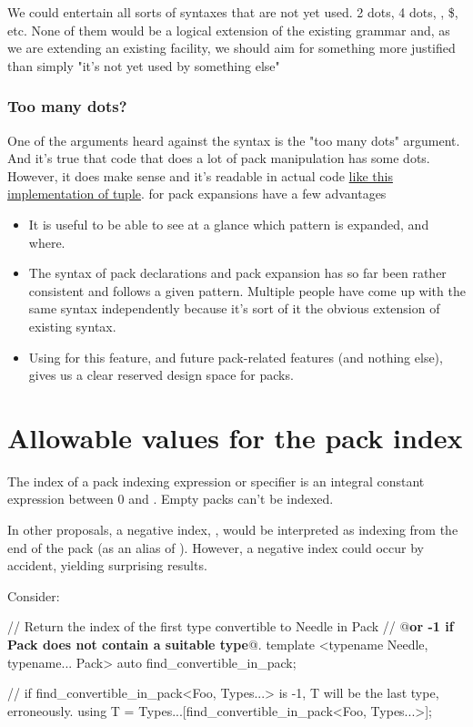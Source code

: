 \documentclass{wg21}
\begin{document}
We could entertain all sorts of syntaxes that are not yet used. 2 dots, 4 dots, \tcode{!},  \$, etc.
None of them would be a logical extension of the existing grammar and, as we are extending an existing facility, we should aim for something more justified than simply "it's not yet used by something else"

\subsubsection{Too many dots?}

One of the arguments heard against the  syntax is the "too many dots" argument.
And it's true that code that does a lot of pack manipulation has some dots.
However, it does make sense and it's readable in actual code \href{https://github.com/seanbaxter/circle/blob/master/tuple/tuple.hxx}{like this implementation of tuple}.
 for pack expansions have a few advantages
\begin{itemize}
\item It is useful to be able to see at a glance which pattern is expanded, and where.
\item The syntax of pack declarations and pack expansion has so far been rather consistent and follows a given pattern. Multiple people have come up with the same syntax independently because it's sort of it the obvious extension of existing syntax.
\item Using  for this feature, and future pack-related features (and nothing else), gives us a clear reserved design space for packs.
\end{itemize}

\section{Allowable values for the pack index}

The index of a pack indexing expression or specifier is an integral constant expression between 0 and .
Empty packs can't be indexed.

In other proposals, a negative index, , would be interpreted as
indexing from the end of the pack (as an alias of ).
However, a negative index could occur by accident, yielding surprising results.

Consider:

\begin{colorblock}
// Return the index of the first type convertible to Needle in Pack
// @\textbf{or -1 if Pack does not contain a suitable type}@.
template <typename Needle, typename... Pack>
auto find_convertible_in_pack;

// if find_convertible_in_pack<Foo, Types...> is -1, T will be the last type, erroneously.
using T = Types...[find_convertible_in_pack<Foo, Types...>];
\end{colorblock}
\end{document}

